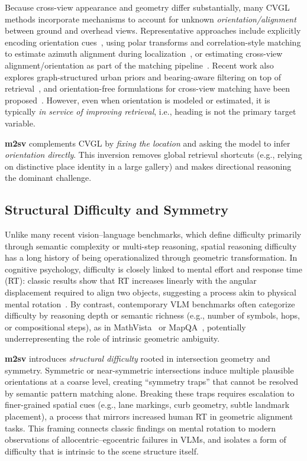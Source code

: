 Because cross-view appearance and geometry differ substantially, many CVGL methods incorporate
mechanisms to account for unknown \emph{orientation/alignment} between ground and overhead views.
Representative approaches include explicitly encoding orientation cues~\cite{liu2019lending},
using polar transforms and correlation-style matching to estimate azimuth alignment during localization~\cite{shi2020wherelooking},
or estimating cross-view alignment/orientation as part of the matching pipeline~\cite{zhu2021revisiting}.
Recent work also explores graph-structured urban priors and bearing-aware filtering on top of retrieval~\cite{shore2025spagbol},
and orientation-free formulations for cross-view matching have been proposed~\cite{hu2025oriloc}.
However, even when orientation is modeled or estimated, it is typically \emph{in service of improving retrieval},
i.e., heading is not the primary target variable.

\textbf{m2sv} complements CVGL by \emph{fixing the location} and asking the model to infer
\emph{orientation directly}. This inversion removes global retrieval shortcuts (e.g., relying on distinctive
place identity in a large gallery) and makes directional reasoning the dominant challenge.

\subsection{Structural Difficulty and Symmetry}
\label{sec:prior-difficulty}

Unlike many recent vision--language benchmarks, which define difficulty primarily
through semantic complexity or multi-step reasoning, spatial reasoning difficulty
has a long history of being operationalized through geometric transformation.
In cognitive psychology, difficulty is closely linked to mental effort and response
time (RT): classic results show that RT increases linearly with the angular
displacement required to align two objects, suggesting a process akin to physical
mental rotation~\citep{shepard1971mental}.
By contrast, contemporary VLM benchmarks often categorize difficulty by reasoning
depth or semantic richness (e.g., number of symbols, hops, or compositional steps),
as in MathVista~\citep{lu2024mathvista} or MapQA~\citep{li2025mapqa}, potentially
underrepresenting the role of intrinsic geometric ambiguity.

\textbf{m2sv} introduces \emph{structural difficulty} rooted in intersection
geometry and symmetry. Symmetric or near-symmetric intersections induce multiple
plausible orientations at a coarse level, creating ``symmetry traps'' that cannot
be resolved by semantic pattern matching alone.
Breaking these traps requires escalation to finer-grained spatial cues
(e.g., lane markings, curb geometry, subtle landmark placement), a process that
mirrors increased human RT in geometric alignment tasks.
This framing connects classic findings on mental rotation
to modern observations of allocentric--egocentric failures in VLMs,
and isolates a form of difficulty that is intrinsic to the scene structure itself.




